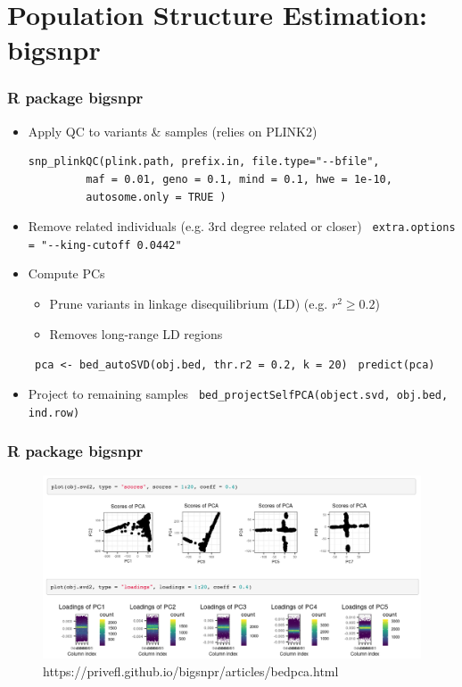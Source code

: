 \documentclass{beamer}
\begin{document}
\section{Population Structure Estimation: bigsnpr}

\begin{frame}[fragile]
	\frametitle{\bf R package bigsnpr}
	\begin{itemize}
			\item   Apply QC to variants \& samples (relies on PLINK2)
	\begin{verbatim} 
snp_plinkQC(plink.path, prefix.in, file.type="--bfile",  
		 maf = 0.01, geno = 0.1, mind = 0.1, hwe = 1e-10,
		 autosome.only = TRUE )
	\end{verbatim}
	\item Remove related individuals (e.g. 3rd degree related or closer)
	\verb| extra.options = "--king-cutoff 0.0442" |
\item Compute PCs
	\begin{itemize}
	\item Prune variants in linkage disequilibrium (LD) (e.g. $r^2 \geq 0.2$)
	\item Removes long-range LD regions
\end{itemize}
\verb| pca <- bed_autoSVD(obj.bed, thr.r2 = 0.2, k = 20)|
\verb| predict(pca)|
\item Project to remaining samples
\verb| bed_projectSelfPCA(object.svd, obj.bed, ind.row)|
	\end{itemize}
\end{frame}


\begin{frame}[fragile]
	\frametitle{\bf R package bigsnpr}
	\vspace{-1em}
		\begin{figure}
		\centering
		\includegraphics[scale=.40]{Figures/pca_bigsnpr}
		\caption{\scriptsize https://privefl.github.io/bigsnpr/articles/bedpca.html}
	\end{figure}
	

\end{frame}
\end{document}
